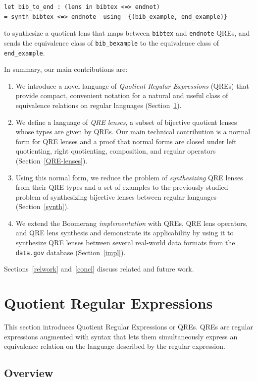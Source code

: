 \documentclass{svproc}
\newcommand{\cd}[1]{\lstinline[backgroundcolor=\color{white}]$#1$}
\begin{document}
\begin{lstlisting}
let bib_to_end : (lens in bibtex <=> endnot) 
= synth bibtex <=> endnote  using  {(bib_example, end_example)}
\end{lstlisting}
\noindent to synthesize a quotient lens that maps between \cd{bibtex} and
\cd{endnote} QREs, and sends the equivalence class of \cd{bib_bexample} to
the equivalence class of \cd{end_example}.

In summary, our main contributions are:
\begin{enumerate}
\item We introduce a novel language of {\em Quotient Regular Expressions}
(QREs) that provide compact, convenient notation for a natural and useful
class of equivalence relations on regular languages (Section~\ref{QRE}).
\item We define a language of {\em QRE lenses}, a subset of bijective quotient
lenses whose types are given by QREs.  Our main technical contribution is a
normal form for QRE lenses and a proof that normal forms are
closed under left quotienting, right quotienting, composition, and regular
operators (Section~\ref{QRE-lenses}).
\item Using this normal form, we reduce the problem of {\em synthesizing}
QRE lenses from their QRE types and a set of examples to the previously studied
problem of synthesizing bijective lenses between regular languages 
(Section~\ref{synth}).
\item We extend the Boomerang {\em implementation} with QREs, QRE lens operators,
and QRE lens synthesis and demonstrate its applicability by using it to
synthesize QRE lenses between several real-world data formats from the
{\tt data.gov} database (Section~\ref{impl}).
\end{enumerate}
Sections~\ref{relwork} and~\ref{concl} discuss related and future work.

\section{Quotient Regular Expressions}
\label{QRE}

This section introduces Quotient Regular Expressions or QREs. QREs are regular
expressions augmented with syntax that lets them simultaneously express an
equivalence relation on the language described by the regular expression.

\subsection{Overview}
\end{document}
